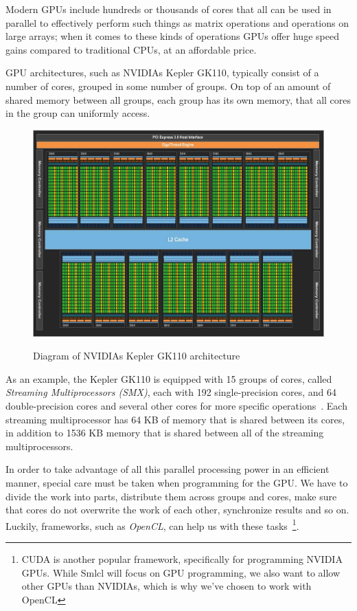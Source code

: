 Modern GPUs include hundreds or thousands of cores that all can be
used in parallel to effectively perform such things as matrix
operations and operations on large arrays; when it comes to these
kinds of operations GPUs offer huge speed gains compared to
traditional CPUs, at an affordable price.

GPU architectures, such as NVIDIAs Kepler GK110, typically consist of
a number of cores, grouped in some number of groups. On top of an
amount of shared memory between all groups, each group has its own
memory, that all cores in the group can uniformly access.

\begin{figure}
  \centering
  \caption{Diagram of NVIDIAs Kepler GK110 architecture}
  \includegraphics[width=1\textwidth]{figures/kepler110.png}
  \label{kepler}
\end{figure}

As an example, the Kepler GK110 is equipped with 15 groups of cores,
called \emph{Streaming Multiprocessors (SMX)}, each with 192
single-precision cores, and 64 double-precision cores and several
other cores for more specific operations~\cite{kepler}. Each streaming
multiprocessor has 64 KB of memory that is shared between its cores,
in addition to 1536 KB memory that is shared between all of the
streaming multiprocessors.

In order to take advantage of all this parallel processing power in an
efficient manner, special care must be taken when programming for the
GPU. We have to divide the work into parts, distribute them across
groups and cores, make sure that cores do not overwrite the work of
each other, synchronize results and so on. Luckily, frameworks, such
as \emph{OpenCL}, can help us with these tasks~\footnote{CUDA is
  another popular framework, specifically for programming NVIDIA
  GPUs. While Smlcl will focus on GPU programming, we also want to
  allow other GPUs than NVIDIAs, which is why we've chosen to work
  with OpenCL}.

